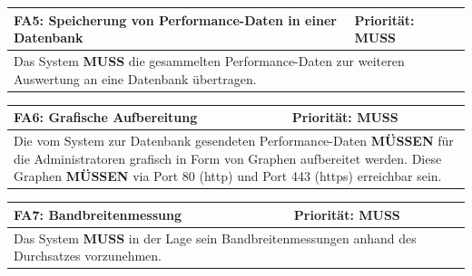 \documentclass[titlepage]{report}
\begin{document}
\begin{center}
\begin{tabular}{p{}>{\raggedleft\arraybackslash}p{}}\toprule
    \textbf{FA5: Speicherung von Performance-Daten in einer Datenbank } & \textbf{Priorität: MUSS} \\\midrule
	\multicolumn{2}{p{\textwidth-\tabcolsep}}{%
        Das System \textbf{MUSS} die gesammelten Performance-Daten
        zur weiteren Auswertung an eine Datenbank übertragen.}\\\bottomrule
\end{tabular}
\end{center}
\begin{center}
\begin{tabular}{p{}>{\raggedleft\arraybackslash}p{}}\toprule
    \textbf{FA6: Grafische Aufbereitung } & \textbf{Priorität: MUSS} \\\midrule
	\multicolumn{2}{p{\textwidth-\tabcolsep}}{%
        Die vom System zur Datenbank gesendeten Performance-Daten
        \textbf{MÜSSEN} für die Administratoren grafisch in Form von
        Graphen aufbereitet werden.
        Diese Graphen \textbf{MÜSSEN} via Port 80 (\gls{http})
        und Port 443 (\gls{https}) erreichbar sein.
        }\\\bottomrule
\end{tabular}
\end{center}
\begin{center}
\begin{tabular}{p{}>{\raggedleft\arraybackslash}p{}}\toprule
    \textbf{FA7: Bandbreitenmessung } & \textbf{Priorität: MUSS} \\\midrule
	\multicolumn{2}{p{\textwidth-\tabcolsep}}{%
        Das System \textbf{MUSS} in der Lage sein Bandbreitenmessungen anhand des
        Durchsatzes vorzunehmen.
                }\\\bottomrule
\end{tabular}
\end{center}
\end{document}
